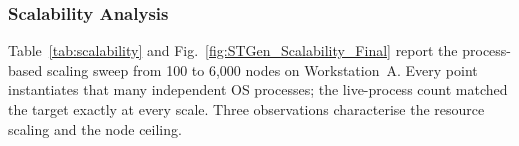 \documentclass[jsan,article,submit,moreauthors,pdftex]{Definitions/mdpi}
\begin{document}
    


\subsubsection*{Scalability Analysis}

Table~\ref{tab:scalability} and Fig.~\ref{fig:STGen_Scalability_Final} report the process-based scaling sweep from 100 to 6{,}000 nodes on Workstation~A. Every point instantiates that many independent OS processes; the live-process count matched the target exactly at every scale. Three observations characterise the resource scaling and the node ceiling.
\end{document}
